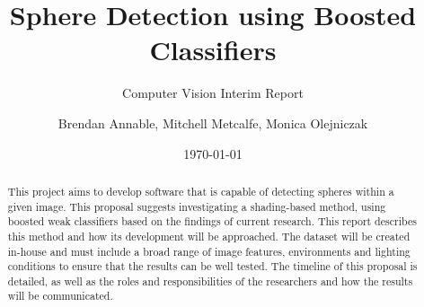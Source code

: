 \documentclass[11pt]{scrartcl}
\title{Sphere Detection using Boosted Classifiers}
\subtitle{Computer Vision Interim Report}
\author{Brendan Annable, Mitchell Metcalfe, Monica Olejniczak}
\date{\today}
\begin{document}
    \maketitle

    \begin{abstract}



        This project aims to develop software that is capable of detecting spheres within a given image. This proposal suggests investigating a shading-based method, using boosted weak classifiers based on the findings of current research. This report
        describes this method and how its development will be approached. The
        dataset will be created in-house and must include a broad
        range of image features, environments and lighting conditions to ensure
        that the results can be well tested. The timeline of this proposal is
        detailed, as well as the roles and responsibilities of the researchers
        and how the results will be communicated.
    \end{abstract}

    \newpage
    \tableofcontents
    \newpage
\end{document}
